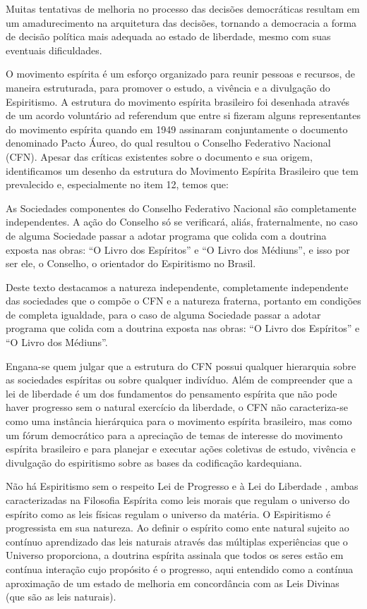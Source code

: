 Muitas tentativas de melhoria no processo das decisões democráticas resultam em um amadurecimento na arquitetura das decisões, tornando a democracia a forma de decisão política mais adequada ao estado de liberdade, mesmo com suas eventuais dificuldades.

O movimento espírita é um esforço organizado para reunir pessoas e recursos, de maneira estruturada, para promover o estudo, a vivência e a divulgação do Espiritismo. A estrutura do movimento espírita brasileiro foi desenhada através de um acordo voluntário ad referendum que entre si fizeram alguns representantes do movimento espírita quando em 1949 assinaram conjuntamente o documento denominado Pacto Áureo, do qual resultou o Conselho Federativo Nacional (CFN). Apesar das críticas existentes sobre o documento e sua origem, identificamos um desenho da estrutura do Movimento Espírita Brasileiro que tem prevalecido e, especialmente no item 12, temos que:


\begin{citacao}
As Sociedades componentes do Conselho Federativo Nacional são completamente independentes. A ação do Conselho só se verificará, aliás, fraternalmente, no caso de alguma Sociedade passar a adotar programa que colida com a doutrina exposta nas obras: “O Livro dos Espíritos” e “O Livro dos Médiuns”, e isso por ser ele, o Conselho, o orientador do Espiritismo no Brasil.
\end{citacao}

Deste texto destacamos a natureza independente, completamente independente das sociedades que o compõe o CFN e a natureza fraterna, portanto em condições de completa igualdade, para o caso de alguma Sociedade passar a adotar programa que colida com a doutrina exposta nas obras: “O Livro dos Espíritos” e “O Livro dos Médiuns”.

Engana-se quem julgar que a estrutura do CFN possui qualquer hierarquia sobre as sociedades espíritas ou sobre qualquer indivíduo. Além de compreender que a lei de liberdade é um dos fundamentos do pensamento espírita que não pode haver progresso sem o natural exercício da liberdade, o CFN não caracteriza-se como uma instância hierárquica para o movimento espírita brasileiro, mas como um fórum democrático para a apreciação de temas de interesse do movimento espírita brasileiro e para planejar e executar ações coletivas de estudo, vivência e divulgação do espiritismo sobre as bases da codificação kardequiana. 

Não há Espiritismo sem o respeito Lei de Progresso \cite[Parte III. Cap. VII ]{Kardec1857} e à Lei do Liberdade \cite[Parte III. Cap.X]{Kardec1857}, ambas caracterizadas na Filosofia Espírita como leis morais que regulam o universo do espírito como as leis físicas regulam o universo da matéria. O Espiritismo é progressista em sua natureza. Ao definir o espírito como ente natural sujeito ao contínuo aprendizado das leis naturais através das múltiplas experiências que o Universo proporciona, a doutrina espírita assinala que todos os seres estão em contínua interação cujo propósito é o progresso, aqui entendido como a contínua aproximação de um estado de melhoria em concordância com as Leis Divinas (que são as leis naturais). 


